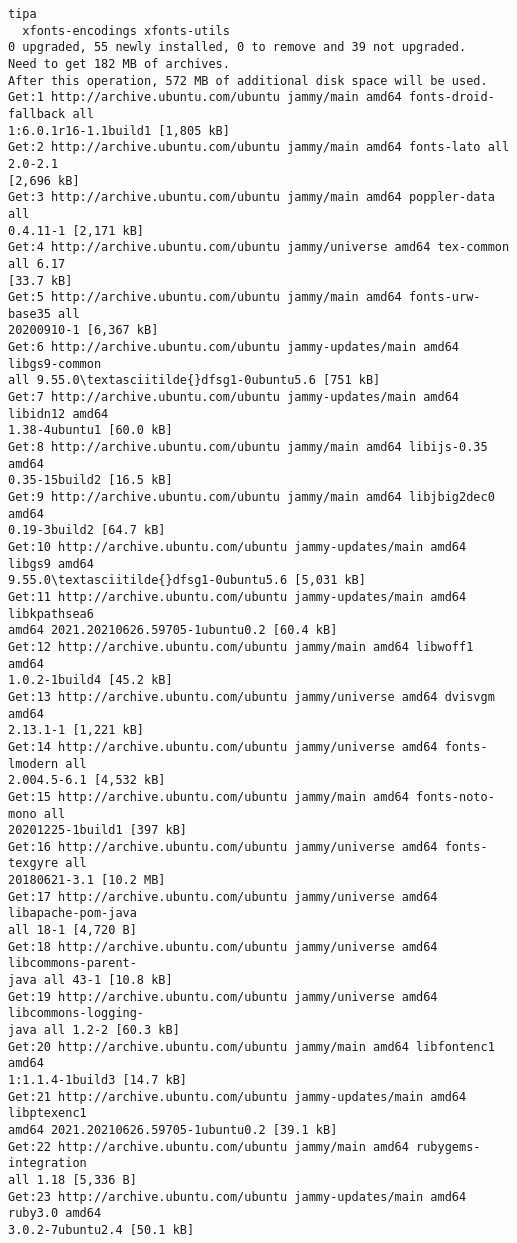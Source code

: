 \documentclass[11pt]{article}
\begin{document}
\begin{Verbatim}[commandchars=\\\{\}]
tipa
  xfonts-encodings xfonts-utils
0 upgraded, 55 newly installed, 0 to remove and 39 not upgraded.
Need to get 182 MB of archives.
After this operation, 572 MB of additional disk space will be used.
Get:1 http://archive.ubuntu.com/ubuntu jammy/main amd64 fonts-droid-fallback all
1:6.0.1r16-1.1build1 [1,805 kB]
Get:2 http://archive.ubuntu.com/ubuntu jammy/main amd64 fonts-lato all 2.0-2.1
[2,696 kB]
Get:3 http://archive.ubuntu.com/ubuntu jammy/main amd64 poppler-data all
0.4.11-1 [2,171 kB]
Get:4 http://archive.ubuntu.com/ubuntu jammy/universe amd64 tex-common all 6.17
[33.7 kB]
Get:5 http://archive.ubuntu.com/ubuntu jammy/main amd64 fonts-urw-base35 all
20200910-1 [6,367 kB]
Get:6 http://archive.ubuntu.com/ubuntu jammy-updates/main amd64 libgs9-common
all 9.55.0\textasciitilde{}dfsg1-0ubuntu5.6 [751 kB]
Get:7 http://archive.ubuntu.com/ubuntu jammy-updates/main amd64 libidn12 amd64
1.38-4ubuntu1 [60.0 kB]
Get:8 http://archive.ubuntu.com/ubuntu jammy/main amd64 libijs-0.35 amd64
0.35-15build2 [16.5 kB]
Get:9 http://archive.ubuntu.com/ubuntu jammy/main amd64 libjbig2dec0 amd64
0.19-3build2 [64.7 kB]
Get:10 http://archive.ubuntu.com/ubuntu jammy-updates/main amd64 libgs9 amd64
9.55.0\textasciitilde{}dfsg1-0ubuntu5.6 [5,031 kB]
Get:11 http://archive.ubuntu.com/ubuntu jammy-updates/main amd64 libkpathsea6
amd64 2021.20210626.59705-1ubuntu0.2 [60.4 kB]
Get:12 http://archive.ubuntu.com/ubuntu jammy/main amd64 libwoff1 amd64
1.0.2-1build4 [45.2 kB]
Get:13 http://archive.ubuntu.com/ubuntu jammy/universe amd64 dvisvgm amd64
2.13.1-1 [1,221 kB]
Get:14 http://archive.ubuntu.com/ubuntu jammy/universe amd64 fonts-lmodern all
2.004.5-6.1 [4,532 kB]
Get:15 http://archive.ubuntu.com/ubuntu jammy/main amd64 fonts-noto-mono all
20201225-1build1 [397 kB]
Get:16 http://archive.ubuntu.com/ubuntu jammy/universe amd64 fonts-texgyre all
20180621-3.1 [10.2 MB]
Get:17 http://archive.ubuntu.com/ubuntu jammy/universe amd64 libapache-pom-java
all 18-1 [4,720 B]
Get:18 http://archive.ubuntu.com/ubuntu jammy/universe amd64 libcommons-parent-
java all 43-1 [10.8 kB]
Get:19 http://archive.ubuntu.com/ubuntu jammy/universe amd64 libcommons-logging-
java all 1.2-2 [60.3 kB]
Get:20 http://archive.ubuntu.com/ubuntu jammy/main amd64 libfontenc1 amd64
1:1.1.4-1build3 [14.7 kB]
Get:21 http://archive.ubuntu.com/ubuntu jammy-updates/main amd64 libptexenc1
amd64 2021.20210626.59705-1ubuntu0.2 [39.1 kB]
Get:22 http://archive.ubuntu.com/ubuntu jammy/main amd64 rubygems-integration
all 1.18 [5,336 B]
Get:23 http://archive.ubuntu.com/ubuntu jammy-updates/main amd64 ruby3.0 amd64
3.0.2-7ubuntu2.4 [50.1 kB]

\end{Verbatim}
\end{document}
